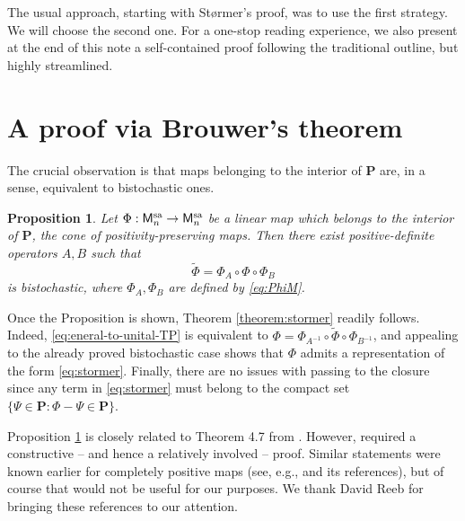 \documentclass[10pt]{article}
\def\tcr{\textcolor{red}}
\def\tcb{\textcolor{blue}}
\newcommand{\PSD}{\mathcal{PSD}}
\newcommand{\cP}{\bm{P}}
\newcommand{\C}{\mathbb{C}}
\newcommand{\cM}{\mathsf{M}}
\newcommand{\sa}{\textnormal{sa}}
\theoremstyle{plain}
\newtheorem{proposition}[theorem]{Proposition}
\theoremstyle{definition}
\theoremstyle{remark}
\begin{document}
The usual approach, starting with St{\o}rmer's proof, was to use the first strategy. 
We will choose the second one.  
For a one-stop reading experience,  we also present 
at the end of this note 
a self-contained proof following the traditional outline, but highly streamlined.   


\section{A proof via Brouwer's theorem} \label{section:brouwer}
The crucial  observation is that maps belonging to the interior of 
$\cP$ are, in a sense, equivalent to bistochastic ones.  

\begin{proposition} \label{prop:general-to-unital-TP} 
Let $\Phi : \cM_n^{\sa} \to \cM_n^{\sa}$ be a linear map which belongs to the interior of 
$\cP$, the cone of positivity-preserving maps. 
Then there exist  positive-definite operators  $A,B$  %
such that 
\begin{equation} \label{eq:eneral-to-unital-TP}
\tilde{\Phi} = \Phi_A\circ \Phi \circ \Phi_B
\end{equation}
 is bistochastic, where $\Phi_A, \Phi_B$ are defined by \eqref{eq:PhiM}. 
\end{proposition}  
Once the Proposition  is shown, Theorem \ref{theorem:stormer} 
readily follows. Indeed,  \eqref{eq:eneral-to-unital-TP} is equivalent to $\Phi= \Phi_{A^{-1}}\circ \tilde{\Phi}  \circ \Phi_{B^{-1}}$, and appealing to 
the already proved bistochastic case shows that 
$\Phi$ admits a representation of the form \eqref{eq:stormer}. 
Finally, there are no issues with passing to the closure since 
any term in \eqref{eq:stormer} must belong to the compact set $\{\Psi \in \cP : \Phi - \Psi \in \cP\}$. 

{Proposition \ref{prop:general-to-unital-TP} is closely related to Theorem 4.7 from \cite{Gurvits04}.  
However,  \cite{Gurvits04} required a constructive -- and hence a relatively involved -- proof. 
Similar statements were known earlier for completely positive maps (see, e.g.,  \cite{GGHE08} and its references), 
but of course that would not be useful for our purposes.}  We thank David Reeb for bringing these references to our
attention. 
\end{document}
